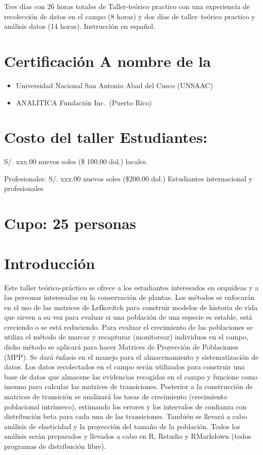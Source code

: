 \documentclass[
]{book}
\theoremstyle{definition}
\theoremstyle{definition}
\theoremstyle{definition}
\theoremstyle{definition}
\theoremstyle{remark}
\begin{document}
Tres días con 26 horas totales de Taller-teórico practico con una
experiencia de recolección de datos en el campo (8 horas) y dos días de
taller--teórico practico y análisis datos (14 horas). Instrucción en
español.

\hypertarget{certificaciuxf3n-a-nombre-de-la}{%
\section{Certificación A nombre de la}\label{certificaciuxf3n-a-nombre-de-la}}

\begin{itemize}
\item
  Universidad Nacional San Antonio Abad del Cusco (UNSAAC)
\item
  ANALITICA Fundación Inc.~(Puerto Rico)
\end{itemize}

\hypertarget{costo-del-taller-estudiantes}{%
\section{Costo del taller Estudiantes:}\label{costo-del-taller-estudiantes}}

S/. xxx.00 nuevos soles (\$ 100.00 dol.) locales.

Profesionales: S/. xxx.00 nuevos soles (\$200.00 dol.) Estudiantes
internacional y profesionales

\hypertarget{cupo-25-personas}{%
\section{Cupo: 25 personas}\label{cupo-25-personas}}

\hypertarget{introducciuxf3n}{%
\section{Introducción}\label{introducciuxf3n}}

Este taller teórico-práctico se ofrece a los estudiantes interesados en
orquídeas y a las personas interesadas en la conservación de plantas.
Los métodos se enfocarán en el uso de las matrices de Lefkovitch para
construir modelos de historia de vida que sirven a su vez para evaluar
si una población de una especie es estable, está creciendo o se está
reduciendo. Para evaluar el crecimiento de las poblaciones se utiliza el
método de marcar y recapturar (monitorear) individuos en el campo, dicho
método se aplicará para hacer Matrices de Proyección de Poblaciones
(MPP). Se dará énfasis en el manejo para el almacenamiento y
sistematización de datos. Los datos recolectados en el campo serán
utilizados para construir una base de datos que almacene las evidencias
recogidas en el campo y funcione como insumo para calcular las matrices
de transiciones. Posterior a la construcción de matrices de transición
se analizará las tasas de crecimiento (crecimiento poblacional
intrínseco), estimando los errores y los intervalos de confianza con
distribución beta para cada una de las transiciones. También se llevará
a cabo análisis de elasticidad y la proyección del tamaño de la
población. Todos los análisis serán preparados y llevados a cabo en R,
Rstudio y RMarkdown (todos programas de distribución libre).
\end{document}
